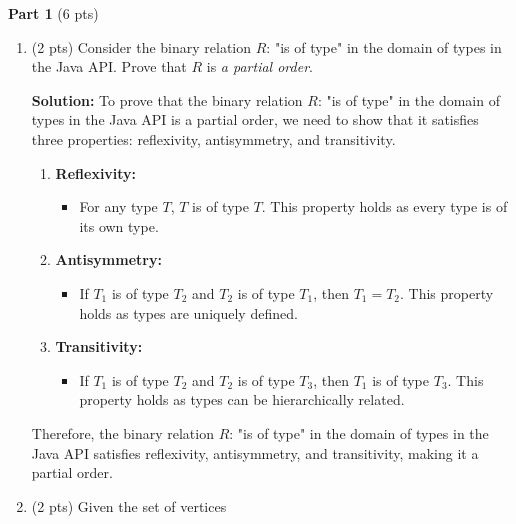 \documentclass[12pt]{article}
\begin{document}
\begin{spacing}{1.5}
	\textbf{Part 1} (6 pts)
			
	\begin{enumerate}
		\item (2 pts) Consider the binary relation $R$: "is of type" in the domain of types in the Java API. Prove that $R$ is \textit{a partial order}.
		      		      		      
		      \textbf{Solution:} To prove that the binary relation $R$: "is of type" in the domain of types in the Java API is a partial order, we need to show that it satisfies three properties: reflexivity, antisymmetry, and transitivity.
		      		      		      
		      \begin{enumerate}
		      	\item \textbf{Reflexivity:}
		      	      \begin{itemize}
		      	      	\item For any type $T$, $T$ is of type $T$. This property holds as every type is of its own type.
		      	      \end{itemize}
		      	      		      	      		      	      
		      	\item \textbf{Antisymmetry:}
		      	      \begin{itemize}
		      	      	\item If $T_1$ is of type $T_2$ and $T_2$ is of type $T_1$, then $T_1 = T_2$. This property holds as types are uniquely defined.
		      	      \end{itemize}
		      	      		      	      		      	      
		      	\item \textbf{Transitivity:}
		      	      \begin{itemize}
		      	      	\item If $T_1$ is of type $T_2$ and $T_2$ is of type $T_3$, then $T_1$ is of type $T_3$. This property holds as types can be hierarchically related.
		      	      \end{itemize}
		      \end{enumerate}
		      		      		      
		      Therefore, the binary relation $R$: "is of type" in the domain of types in the Java API satisfies reflexivity, antisymmetry, and transitivity, making it a partial order. 
		      		      		      
		\item (2 pts) Given the set of vertices
		      		      		      

\end{enumerate}
\end{spacing}
\end{document}
